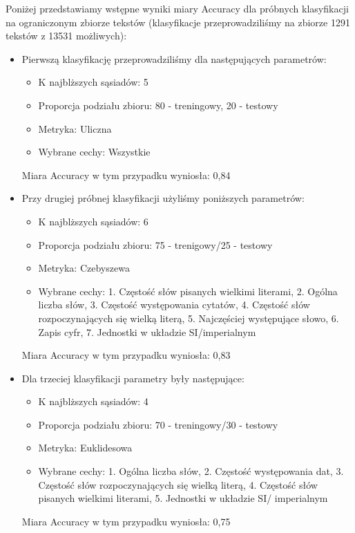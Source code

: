 \documentclass{classrep}
\begin{document}
Poniżej przedstawiamy wstępne wyniki miary Accuracy dla próbnych klasyfikacji na ograniczonym zbiorze tekstów (klasyfikacje przeprowadziliśmy na zbiorze 1291 tekstów z 13531 możliwych):
\begin{itemize}
    \item Pierwszą klasyfikację przeprowadziliśmy dla następujących parametrów:
    \begin{itemize}
        \item K najblższych sąsiadów: 5
        \item Proporcja podziału zbioru: 80 - treningowy, 20 - testowy
        \item Metryka: Uliczna
        \item Wybrane cechy: Wszystkie
    \end{itemize}
    Miara Accuracy w tym przypadku wyniosła: 0,84
    
    \item Przy drugiej próbnej klasyfikacji użyliśmy poniższych parametrów:
    \begin{itemize}
        \item K najblższych sąsiadów: 6
        \item Proporcja podziału zbioru: 75 - trenigowy/25 - testowy
        \item Metryka: Czebyszewa
        \item Wybrane cechy: 1. Częstość słów pisanych wielkimi literami, 2. Ogólna liczba słów, 3. Częstość występowania cytatów, 4. Częstość słów rozpoczynających się wielką literą, 5. Najczęściej występujące słowo, 6. Zapis cyfr, 7. Jednostki w układzie SI/imperialnym
    \end{itemize}
    Miara Accuracy w tym przypadku wyniosła: 0,83
    
    \item Dla trzeciej klasyfikacji parametry były następujące:
     \begin{itemize}
        \item K najblższych sąsiadów: 4
        \item Proporcja podziału zbioru: 70 - treningowy/30 - testowy
        \item Metryka: Euklidesowa
        \item Wybrane cechy: 1. Ogólna liczba słów, 2. Częstość występowania dat, 3. Częstość słów rozpoczynających się wielką literą, 4.  Częstość słów pisanych wielkimi literami, 5. Jednostki w układzie SI/ imperialnym
    \end{itemize}
    Miara Accuracy w tym przypadku wyniosła: 0,75
    

\end{itemize}
\end{document}
